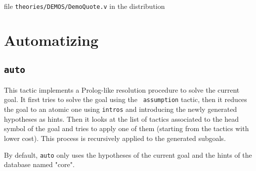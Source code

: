 \SeeAlso file \texttt{theories/DEMOS/DemoQuote.v} in the distribution

\section{Automatizing}
\label{Automatizing}

\subsection{\tt auto}
\label{auto}
This tactic implements a Prolog-like resolution procedure to solve the
current goal. It first tries to solve the goal using the {\tt
  assumption} tactic, then it reduces the goal to an atomic one using
{\tt intros} and introducing the newly generated hypotheses as hints.
Then it looks at the list of tactics associated to the head symbol of
the goal and tries to apply one of them (starting from the tactics
with lower cost). This process is recursively applied to the generated
subgoals. 

By default, \texttt{auto} only uses the hypotheses of the current goal and the
hints of the database named "core". 



